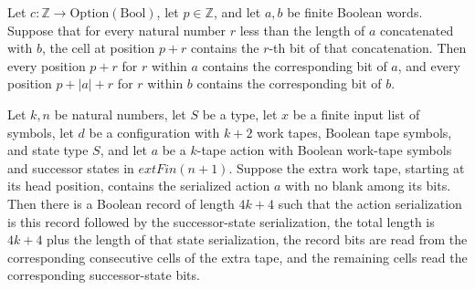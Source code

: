 \begin{lemma}
\label{Turing.StepBlock.reads_append}
\leanok
{}
Let $c:\mathbb{Z}\to\mathrm{Option}(\mathrm{Bool})$, let $p\in\mathbb{Z}$, and let $a,b$
be finite Boolean words. Suppose that for every natural number $r$ less than the length
of $a$ concatenated with $b$, the cell at position $p+r$ contains the $r$-th bit of that
concatenation. Then every position $p+r$ for $r$ within $a$ contains the corresponding
bit of $a$, and every position $p+|a|+r$ for $r$ within $b$ contains the corresponding
bit of $b$.
\end{lemma}

\begin{lemma}
\label{Turing.StepBlock.actionBitsK_reads}
\leanok
{}
Let $k,n$ be natural numbers, let $S$ be a type, let $x$ be a finite input list of
symbols, let $d$ be a configuration with $k+2$ work tapes, Boolean tape symbols, and
state type $S$, and let $a$ be a $k$-tape action with Boolean work-tape symbols and
successor states in $	ext{Fin}(n+1)$. Suppose the extra work tape, starting at its head
position, contains the serialized action $a$ with no blank among its bits. Then there is
a Boolean record of length $4k+4$ such that the action serialization is this record
followed by the successor-state serialization, the total length is $4k+4$ plus the
length of that state serialization, the record bits are read from the corresponding
consecutive cells of the extra tape, and the remaining cells read the corresponding
successor-state bits.
\end{lemma}

